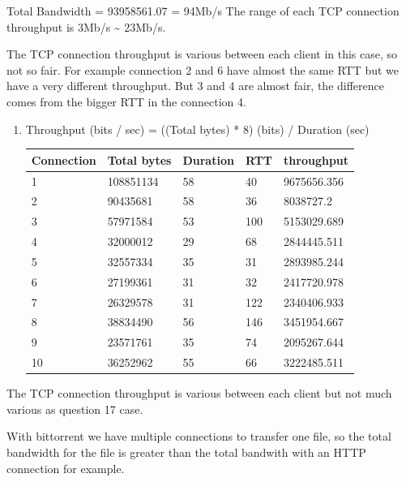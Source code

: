 \documentclass[a4paper,11pt,final]{report}
\begin{document}
Total Bandwidth = 93958561.07 = 94Mb/s The range of each TCP connection
throughput is 3Mb/s \textasciitilde{} 23Mb/s.

The TCP connection throughput is various between each client in this
case, so not so fair. For example connection 2 and 6 have almost the
same RTT but we have a very different throughput. But 3 and 4 are almost
fair, the difference comes from the bigger RTT in the connection 4.

\begin{enumerate}
\def\labelenumi{\arabic{enumi}.}
\setcounter{enumi}{17}
\item
  Throughput (bits / sec) = ((Total bytes) * 8) (bits) / Duration (sec)\\
      \begin{tabular}{|l|l|l|l|l|}
    \hline
        Connection & Total bytes & Duration & RTT & throughput \\ \hline
        1 & 108851134 & 58 & 40 & 9675656.356 \\ \hline
        2 & 90435681 & 58 & 36 & 8038727.2 \\ \hline
        3 & 57971584 & 53 & 100 & 5153029.689 \\ \hline
        4 & 32000012 & 29 & 68 & 2844445.511 \\ \hline
        5 & 32557334 & 35 & 31 & 2893985.244 \\ \hline
        6 & 27199361 & 31 & 32 & 2417720.978 \\ \hline
        7 & 26329578 & 31 & 122 & 2340406.933 \\ \hline
        8 & 38834490 & 56 & 146 & 3451954.667 \\ \hline
        9 & 23571761 & 35 & 74 & 2095267.644 \\ \hline
        10 & 36252962 & 55 & 66 & 3222485.511 \\ \hline
    \end{tabular}
\end{enumerate}

The TCP connection throughput is various between each client but not
much various as question 17 case.

With bittorrent we have multiple connections to transfer one file, so
the total bandwidth for the file is greater than the total bandwith with
an HTTP connection for example.
\end{document}
